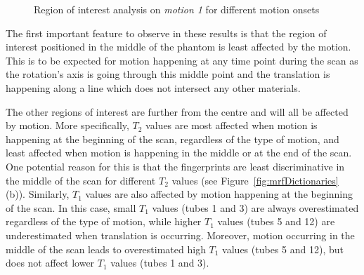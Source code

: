 \begin{figure}[ht]
    \caption{Region of interest analysis on \textit{motion 1} for different motion onsets}
    \label{fig:motion1ROI}
\end{figure}

\hfill

The first important feature to observe in these results is that the region of interest positioned in the middle of the phantom is least affected by the motion.
This is to be expected for motion happening at any time point during the scan as the rotation's axis is going through this middle point and the translation is happening along a line which does not intersect any other materials.

\hfill

The other regions of interest are further from the centre and will all be affected by motion.
More specifically, $T_2$ values are most affected when motion is happening at the beginning of the scan, regardless of the type of motion, and least affected when motion is happening in the middle or at the end of the scan.
One potential reason for this is that the fingerprints are least discriminative in the middle of the scan for different $T_2$ values (see Figure~\ref{fig:mrfDictionaries} (b)).
Similarly, $T_1$ values are also affected by motion happening at the beginning of the scan.
In this case, small $T_1$ values (tubes 1 and 3) are always overestimated regardless of the type of motion, while higher $T_1$ values (tubes 5 and 12) are underestimated when translation is occurring.
Moreover, motion occurring in the middle of the scan leads to overestimated high $T_1$ values (tubes 5 and 12), but does not affect lower $T_1$ values (tubes 1 and 3).

\hfill

